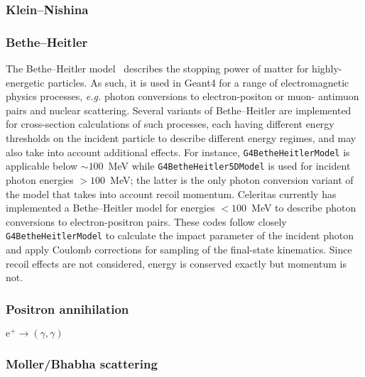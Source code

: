 \subsubsection{Klein--Nishina}


\subsubsection{Bethe--Heitler}

The Bethe--Heitler model~\cite{Bethe:1934za} describes the stopping power of
matter for highly-energetic particles.
As such, it is used in Geant4 for a range of electromagnetic
physics processes, \textit{e.g.} photon conversions to electron-positon or muon-
antimuon pairs and nuclear scattering.
Several variants of Bethe--Heitler are implemented for cross-section
calculations of such processes, each having different energy thresholds on the
incident particle to describe different energy regimes, and may also take into
account additional effects.
For instance, \texttt{G4BetheHeitlerModel} is applicable below
$\sim100$~MeV while \texttt{G4BetheHeitler5DModel} is used for incident photon
energies $>100$~MeV;
the latter is the only photon conversion variant of the model that takes into
account recoil momentum.
Celeritas currently has implemented a Bethe--Heitler model for energies
$< 100$~MeV to describe photon conversions to electron-positron pairs.
These codes follow closely \texttt{G4BetheHeitlerModel} to calculate
the impact parameter of the incident photon and apply Coulomb corrections for
sampling of the final-state kinematics.
Since recoil effects are not considered, energy is conserved exactly but
momentum is not.
\subsubsection{Positron annihilation}

$\textrm{e}^+ \to (\gamma, \gamma)$

\subsubsection{Moller/Bhabha scattering}

